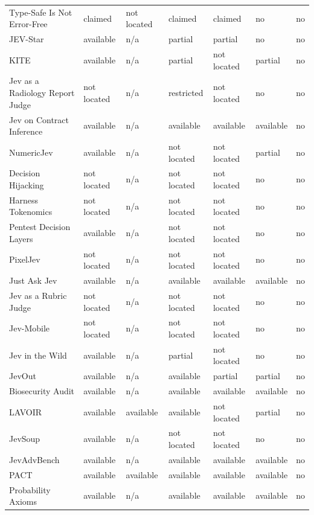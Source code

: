 \begin{table}[tbp]
\begin{tabularx}{\linewidth}{Xllllll}
Type-Safe Is Not Error-Free & claimed & not located & claimed & claimed & no & no \\
JEV-Star & available & n/\allowbreak{}a & partial & partial & no & no \\
KITE & available & n/\allowbreak{}a & partial & not located & partial & no \\
Jev as a Radiology Report Judge & not located & n/\allowbreak{}a & restricted & not located & no & no \\
Jev on Contract Inference & available & n/\allowbreak{}a & available & available & available & no \\
NumericJev & available & n/\allowbreak{}a & not located & not located & partial & no \\
Decision Hijacking & not located & n/\allowbreak{}a & not located & not located & no & no \\
Harness Tokenomics & not located & n/\allowbreak{}a & not located & not located & no & no \\
Pentest Decision Layers & available & n/\allowbreak{}a & not located & not located & no & no \\
PixelJev & not located & n/\allowbreak{}a & not located & not located & no & no \\
Just Ask Jev & available & n/\allowbreak{}a & available & available & available & no \\
Jev as a Rubric Judge & not located & n/\allowbreak{}a & not located & not located & no & no \\
Jev-Mobile & not located & n/\allowbreak{}a & not located & not located & no & no \\
Jev in the Wild & available & n/\allowbreak{}a & partial & not located & no & no \\
JevOut & available & n/\allowbreak{}a & available & partial & partial & no \\
Biosecurity Audit & available & n/\allowbreak{}a & available & available & available & no \\
LAVOIR & available & available & available & not located & partial & no \\
JevSoup & available & n/\allowbreak{}a & not located & not located & no & no \\
JevAdvBench & available & n/\allowbreak{}a & available & available & available & no \\
PACT & available & available & available & available & available & no \\
Probability Axioms & available & n/\allowbreak{}a & available & available & available & no \\

\end{tabularx}
\end{table}
